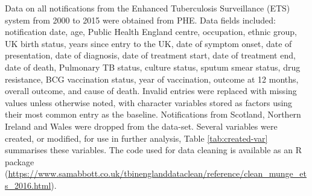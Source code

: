 \documentclass[11pt,twoside]{bristolthesis}
\begin{document}
  Data on all notifications from the Enhanced Tuberculosis Surveillance (ETS) system from 2000 to 2015 were obtained from PHE. Data fields included: notification date, age, Public Health England centre, occupation, ethnic group, UK birth status, years since entry to the UK, date of symptom onset, date of presentation, date of diagnosis, date of treatment start, date of treatment end, date of death, Pulmonary TB status, culture status, sputum smear status, drug resistance, BCG vaccination status, year of vaccination, outcome at 12 months, overall outcome, and cause of death. Invalid entries were replaced with missing values unless otherwise noted, with character variables stored as factors using their most common entry as the baseline. Notifications from Scotland, Northern Ireland and Wales were dropped from the data-set. Several variables were created, or modified, for use in further analysis, Table \ref{tab:created-var} summarises these variables. The code used for data cleaning is available as an R package (\url{https://www.samabbott.co.uk/tbinenglanddataclean/reference/clean_munge_ets_2016.html}).
\end{document}
